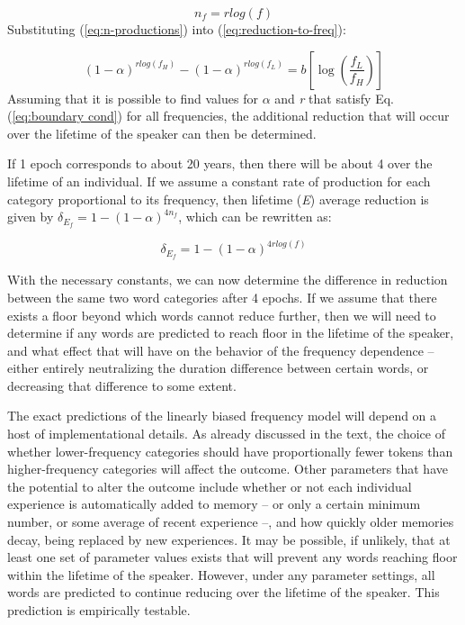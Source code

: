 \begin{equation}
n_{f}=rlog(f)\label{eq:n-productions}
\end{equation}
Substituting (\ref{eq:n-productions}) into (\ref{eq:reduction-to-freq}):

\begin{equation}
(1-\alpha)^{rlog(f_{H})}-(1-\alpha)^{rlog(f_{L})}=b\left[\log\left(\frac{f_{L}}{f_{H}}\right)\right]\label{eq:boundary cond}
\end{equation}
Assuming that it is possible to find values for $\alpha$ and \emph{r}
that satisfy Eq. (\ref{eq:boundary cond}) for all frequencies, the
additional reduction that will occur over the lifetime of the speaker
can then be determined. 

If 1 epoch corresponds to about 20 years, then there will be about
4 over the lifetime of an individual. If we assume a constant rate
of production for each category proportional to its frequency, then
lifetime (\emph{E}) average reduction is given by $\delta_{E_{f}}=1-(1-\alpha)^{4n_{f}}$,
which can be rewritten as:

\begin{equation}
\delta_{E_{f}}=1-(1-\alpha)^{4rlog(f)}
\end{equation}

With the necessary constants, we can now determine the difference
in reduction between the same two word categories after 4 epochs.
If we assume that there exists a floor beyond which words cannot reduce
further, then we will need to determine if any words are predicted
to reach floor in the lifetime of the speaker, and what effect that
will have on the behavior of the frequency dependence – either entirely
neutralizing the duration difference between certain words, or decreasing
that difference to some extent. 

The exact predictions of the linearly biased frequency model will
depend on a host of implementational details. As already discussed
in the text, the choice of whether lower-frequency categories should
have proportionally fewer tokens than higher-frequency categories
will affect the outcome. Other parameters that have the potential
to alter the outcome include whether or not each individual experience
is automatically added to memory – or only a certain minimum number,
or some average of recent experience –, and how quickly older memories
decay, being replaced by new experiences. It may be possible, if unlikely,
that at least one set of parameter values exists that will prevent
any words reaching floor within the lifetime of the speaker. However,
under any parameter settings, all words are predicted to continue
reducing over the lifetime of the speaker. This prediction is empirically
testable.

